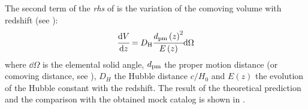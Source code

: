 The second term of the \emph{rhs} of  is the variation
of the comoving volume with redshift (see \citet{Hogg+99}):
%
\begin{equation}
    \cfrac{{\rm{d}} V}{{\rm{d}} z} = D_{\rm H} \cfrac{{d_{\rm pm} \left(z\right)}^2}
    {E\left(z\right)} {\rm{d}} \Omega
\end{equation}
%
where $\dd\Omega$ is the elemental solid angle, $d_{\rm pm}$ the proper motion
distance (or comoving distance, see ), $D_H$ the
Hubble distance $c/H_0$ and $E\left(z\right)$ the evolution of the Hubble
constant with the redshift. The result of the theoretical prediction and the
comparison with the obtained mock catalog is shown in .

